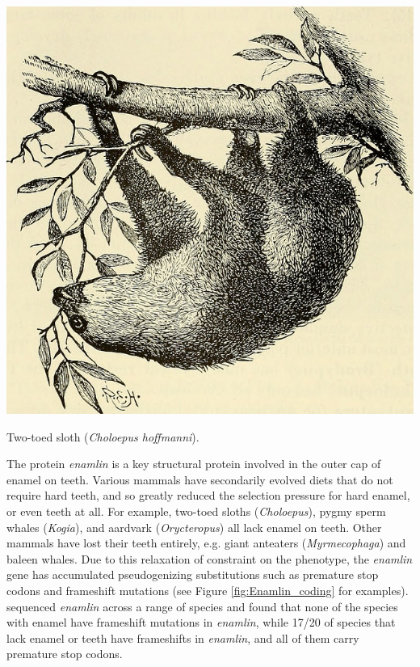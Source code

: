 \begin{marginfigure}
\begin{center}
\includegraphics[width=\textwidth]{illustration_images/Genetic_drift/sloth/20423856040_6e4360df9c_z.jpg}   %
\end{center}
\caption{Two-toed sloth ({\it Choloepus hoffmanni}).  } \label{fig:sloth}
\end{marginfigure}

The protein {\it enamlin} is a key structural protein involved in the outer cap of enamel on teeth. Various mammals have secondarily evolved diets that do not require hard teeth, and so greatly reduced the selection pressure for hard enamel, or even teeth at all. For example, two-toed sloths ({\it Choloepus}), pygmy sperm whales ({\it Kogia}), and aardvark ({\it Orycteropus}) all lack  enamel on teeth.
Other mammals have lost their teeth entirely, e.g. giant anteaters
({\it Myrmecophaga}) and baleen whales. Due to this relaxation of
constraint on the phenotype, the {\it enamlin} gene has accumulated pseudogenizing substitutions such as premature stop codons and frameshift mutations (see Figure \ref{fig:Enamlin_coding}
for examples).  \citet{Meredith:09} sequenced {\it enamlin} across a
range of species and found that none of the species with enamel have frameshift
mutations in {\it enamlin}, while 17/20 of species that lack enamel or teeth have
frameshifts in {\it enamlin}, and all of them carry premature stop codons. 

